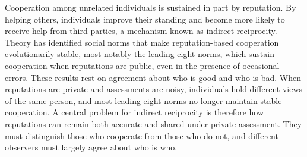 Cooperation among unrelated individuals is sustained in part by reputation\cite{milinski2016,nowak2005}. By helping others, individuals improve their standing and become more likely to receive help from third parties, a mechanism known as indirect reciprocity\cite{nowak1998,leimar2001,wedekind2000,milinski2002}. Theory has identified social norms that make reputation-based cooperation evolutionarily stable\cite{panchanathan2003,ohtsuki2004}, most notably the leading-eight norms, which sustain cooperation when reputations are public, even in the presence of occasional errors\cite{ohtsuki2004,ohtsuki2006}. These results rest on agreement about who is good and who is bad. When reputations are private and assessments are noisy, individuals hold different views of the same person\cite{takahashi2006,uchida2010}, and most leading-eight norms no longer maintain stable cooperation\cite{hilbe2018,okada2018,perret2021,fujimoto2023}. A central problem for indirect reciprocity is therefore how reputations can remain both accurate and shared under private assessment. They must distinguish those who cooperate from those who do not, and different observers must largely agree about who is who\cite{fujimoto2022,murase2024synchronization}.
